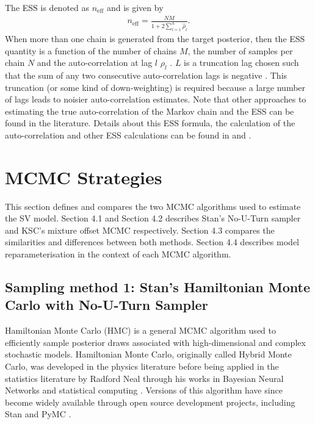 \documentclass[12pt, a4paper]{article}
\begin{document}
            The ESS is denoted as $n_{\text{eff}}$ and is given by
            \begin{align}
                n_{\text{eff}} = \frac{NM}{1+2 \sum_{l=1}^L \hat{\rho}_l}.
            \end{align}
            When more than one chain is generated from the target posterior, then the ESS quantity is a function of the number of chains $M$, the number of samples per chain $N$ and the auto-correlation at lag $l$ $\rho_l$ \citep{vehtari2021rank}. $L$ is a truncation lag chosen such that the sum of any two consecutive auto-correlation lags is negative \citep{geyer1992practical}. This truncation (or some kind of down-weighting) is required because a large number of lags leads to noisier auto-correlation estimates. Note that other approaches to estimating the true auto-correlation of the Markov chain and the ESS can be found in the literature. Details about this ESS formula, the calculation of the auto-correlation and other ESS calculations can be found in \citet{vehtari2021rank} and \citet{geyer1992practical}.

\section{MCMC Strategies}
This section defines and compares the two MCMC algorithms used to estimate the SV model. Section 4.1 and Section 4.2 describes Stan's No-U-Turn sampler and KSC's mixture offset MCMC respectively. Section 4.3 compares the similarities and differences between both methods. Section 4.4 describes model reparameterisation in the context of each MCMC algorithm. 
    \subsection{Sampling method 1: Stan's Hamiltonian Monte Carlo with No-U-Turn Sampler}
        Hamiltonian Monte Carlo (HMC) is a general MCMC algorithm used to efficiently sample posterior draws associated with high-dimensional and complex stochastic models. Hamiltonian Monte Carlo, originally called Hybrid Monte Carlo, was developed in the physics literature \citep{duane1987hybrid} before being applied in the statistics literature by Radford Neal through his works in Bayesian Neural Networks \citep{neal1995bayesian} and statistical computing \citep{neal2011mcmc}. Versions of this algorithm have since become widely available through open source development projects, including Stan \citep{stan} and PyMC \citep{pymc2023}.
\end{document}
